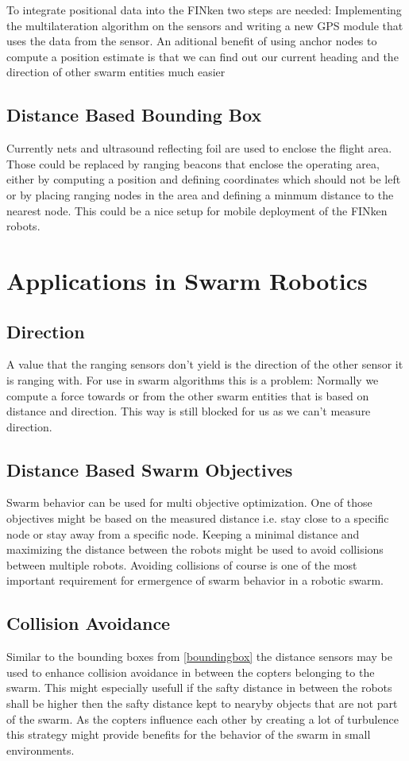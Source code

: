 To integrate positional data into the FINken two steps are needed: Implementing the multilateration algorithm on the sensors and writing a new GPS module that uses the data from the sensor.
An aditional benefit of using anchor nodes to compute a position estimate is that we can find out our current heading and the direction of other swarm entities much easier

\subsection{Distance Based Bounding Box}
\label{boundingbox}
Currently nets and ultrasound reflecting foil are used to enclose the flight area.
Those could be replaced by ranging beacons that enclose the operating area, either by computing a position and defining coordinates which should not be left or by placing ranging nodes in the area and defining a minmum distance to the nearest node.
This could be a nice setup for mobile deployment of the FINken robots.


\section{Applications in Swarm Robotics}

\subsection{Direction}
A value that the ranging sensors don't yield is the direction of the other sensor it is ranging with.
For use in swarm algorithms this is a problem: Normally we compute a force towards or from the other swarm entities that is based on distance and direction.
This way is still blocked for us as we can't measure direction.

\subsection{Distance Based Swarm Objectives}
Swarm behavior can be used for multi objective optimization.
One of those objectives might be based on the measured distance i.e. stay close to a specific node or stay away from a specific node.
Keeping a minimal distance and maximizing the distance between the robots might be used to avoid collisions between multiple robots.
Avoiding collisions of course is one of the most important requirement for ermergence of swarm behavior in a robotic swarm.

\subsection{Collision Avoidance}
Similar to the bounding boxes from \autoref{boundingbox} the distance sensors may be used to enhance collision avoidance in between the copters belonging to the swarm.
This might especially usefull if the safty distance in between the robots shall be higher then the safty distance kept to nearyby objects that are not part of the swarm.
As the copters influence each other by creating a lot of turbulence this strategy might provide benefits for the behavior of the swarm in small environments.

